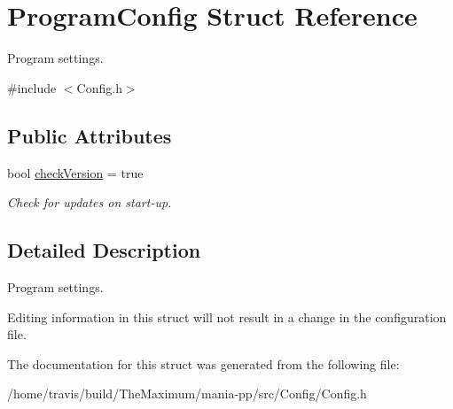 \hypertarget{structProgramConfig}{\section{Program\-Config Struct Reference}
\label{structProgramConfig}
}


Program settings.  




{\ttfamily \#include $<$Config.\-h$>$}

\subsection*{Public Attributes}
\begin{DoxyCompactItemize}
\item 
\hypertarget{structProgramConfig_a81805b60cf29dde387be6672e4dd49aa}{bool \hyperlink{structProgramConfig_a81805b60cf29dde387be6672e4dd49aa}{check\-Version} = true}\label{structProgramConfig_a81805b60cf29dde387be6672e4dd49aa}

\begin{DoxyCompactList}\small\item\em Check for updates on start-\/up. \end{DoxyCompactList}\end{DoxyCompactItemize}


\subsection{Detailed Description}
Program settings. 

Editing information in this struct will not result in a change in the configuration file. 

The documentation for this struct was generated from the following file\-:\begin{DoxyCompactItemize}
\item 
/home/travis/build/\-The\-Maximum/mania-\/pp/src/\-Config/Config.\-h\end{DoxyCompactItemize}
